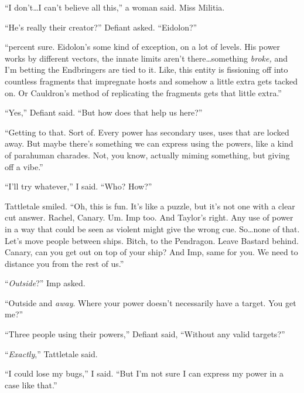 ``I don't\ldots I can't believe all this,'' a woman said.  Miss Militia.



``He's really their creator?''  Defiant asked.  ``Eidolon?''



``\ldotsSixty percent sure.  Eidolon's some kind of exception, on a lot of levels.  His power works by different vectors, the innate limits aren't there\ldots something \emph{broke, }and I'm betting the Endbringers are tied to it.  Like, this entity is fissioning off into countless fragments that impregnate hosts and somehow a little extra gets tacked on.  Or Cauldron's method of replicating the fragments gets that little extra.''



``Yes,'' Defiant said.  ``But how does that help us here?''



``Getting to that.  Sort of.  Every power has secondary uses, uses that are locked away.  But maybe there's something we can express using the powers, like a kind of parahuman charades.  Not, you know, actually miming something, but giving off a vibe.''



``I'll try whatever,'' I said.  ``Who?  How?''



Tattletale smiled.  ``Oh, this is fun.  It's like a puzzle, but it's not one with a clear cut answer.  Rachel, Canary.  Um.  Imp too.  And Taylor's right.  Any use of power in a way that could be seen as violent might give the wrong cue.  So\ldots none of that.  Let's move people between ships.  Bitch, to the Pendragon.  Leave Bastard behind.  Canary, can you get out on top of your ship?  And Imp, same for you.  We need to distance you from the rest of us.''



``\emph{Outside}?'' Imp asked.



``Outside and \emph{away}.  Where your power doesn't necessarily have a target.  You get me?''



``Three people using their powers,'' Defiant said, ``Without any valid targets?''



``\emph{Exactly},'' Tattletale said.



``I could lose my bugs,'' I said.  ``But I'm not sure I can express my power in a case like that.''



